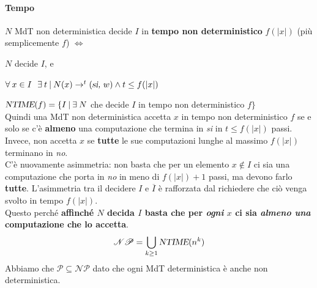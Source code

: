 \documentclass[10pt]{book}
\begin{document}
\paragraph{Tempo} $N$ MdT non deterministica decide $I$ in \textbf{tempo non deterministico} $f(|x|)$ (più semplicemente $f$) $\Leftrightarrow$
\begin{list}{}{}
	\item $N$ decide $I$, e
	\item $\forall\: x \in I\:\:\:\exists\: t\:|\:N(x)\rightarrow^t(\textsl{si, }w) \wedge t \leq f(|x|)$
\end{list}
$\textsl{NTIME}(f) = \{I \:|\:\exists\:N$ che decide $I$ in tempo non deterministico $f\}$\\
Quindi una MdT non deterministica accetta $x$ in tempo non deterministico $f$ se e solo se c'è \textbf{almeno} una computazione che termina in \textit{si} in $t \leq f(|x|)$ passi. Invece, non accetta $x$ se \textbf{tutte} le sue computazioni lunghe al massimo $f(|x|)$ terminano in \textit{no}.\\
C'è nuovamente asimmetria: non basta che per un elemento $x\not\in I$ ci sia una computazione che porta in \textit{no} in meno di $f(|x|)+1$ passi, ma devono farlo \textbf{tutte}. L'asimmetria tra il decidere $I$ e $\overline{I}$ è rafforzata dal richiedere che ciò venga svolto in tempo $f(|x|)$.\\
Questo perché \textbf{affinché $N$ decida $I$ basta che per \textit{ogni} $x$ ci sia \textit{almeno una} computazione che lo accetta}.
$$\mathscr{NP} = \bigcup_{k\geq 1}\textsl{NTIME}(n^k)$$
Abbiamo che $\mathscr{P}\subseteq\mathscr{NP}$ dato che ogni MdT deterministica è anche non deterministica.
\pagebreak
\end{document}
